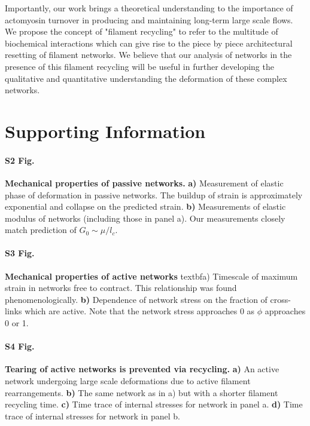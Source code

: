 \documentclass[10pt,letterpaper]{article}
\begin{document}
Importantly, our work brings a theoretical understanding to the importance of actomyosin turnover in producing and maintaining long-term large scale flows.  We propose the concept of "filament recycling" to refer to the multitude of biochemical interactions which can give rise to the piece by piece architectural resetting of filament networks.  We believe that our analysis of networks in the presence of this filament recycling will be useful in further developing the qualitative and quantitative understanding the deformation of these complex networks.

\section*{Supporting Information}


\paragraph*{S2 Fig.}
\label{fig:passive_supp}
{\bf  Mechanical properties of passive networks.}  \textbf{a)} Measurement of elastic phase of deformation in passive networks.  The buildup of strain is approximately exponential and collapse on the predicted strain.  \textbf{b)}  Measurements of elastic modulus of networks (including those in panel a).  Our measurements closely match prediction of $G_0\sim \mu/l_c$.

\paragraph*{S3 Fig.}
\label{fig:active_supp}
{\bf Mechanical properties of active networks } textbf{a)}  Timescale of maximum strain in networks free to contract.  This relationship was found phenomenologically.  \textbf{b)}  Dependence of network stress on the fraction of cross-links which are active.  Note that the network stress approaches 0 as $\phi$ approaches 0 or 1.

\paragraph*{S4 Fig.}
\label{fig:tear_supp}
{\bf  Tearing of active networks is prevented via recycling. } \textbf{a)}  An active network undergoing large scale deformations due to active filament rearrangements.  \textbf{b)}  The same network as in a) but with a shorter filament recycling time.  \textbf{c)}  Time trace of internal stresses for network in panel a.  \textbf{d)}   Time trace of internal stresses for network in panel b. 
\end{document}
